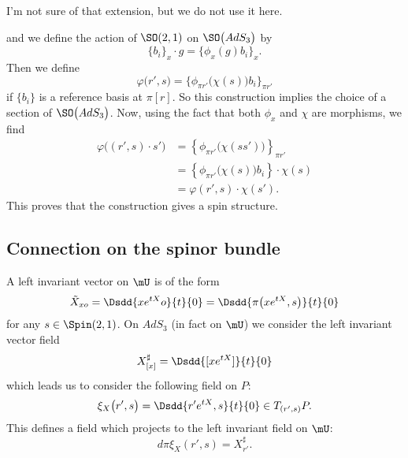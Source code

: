 \begin{probleme}
    I'm not sure of that extension, but we do not use it here.
\end{probleme}


and we define the action of $\SO(2,1)$ on $\SO\big( AdS_3 \big)$ by
\begin{equation}
\{ b_{i} \}_{x}\cdot g=\{ \phi_{x}(g)b_{i} \}_{x}.
\end{equation}
Then we define
\begin{equation}
  \varphi\big( r',s \big)=\{ \phi_{\pi r'}\big( \chi(s) \big)b_{i} \}_{\pi r'}
\end{equation}
 if $\{ b_{i} \}$ is a reference basis at $\pi[r]$. So this construction implies the choice of a section of $\SO\big( AdS_3 \big)$. Now, using the fact that both $\phi_{x}$ and $\chi$ are morphisms, we find
\begin{equation}
\begin{split}
\varphi\big( (r',s)\cdot s' \big)&=\left\{ \phi_{\pi r'}\big( \chi(ss') \big) \right\}_{\pi r'}\\
            &=\left\{ \phi_{\pi r'}\big( \chi(s) \big)b_{i} \right\}\cdot\chi(s)\\
            &=\varphi(r',s)\cdot\chi(s').
\end{split}
\end{equation}
This proves that the construction gives a spin structure.

\subsection{Connection on the spinor bundle}

A left invariant vector on $\mU$ is of the form
\[
  \tilde X_{xo}=\Dsdd{ x e^{tX}o }{t}{0}
        =\Dsdd{ \pi\big( x e^{tX},s \big) }{t}{0}
\]
for any $s\in\Spin(2,1)$. On $AdS_3$ (in fact on $\mU$) we consider the left invariant vector field
\begin{equation}
X^{\sharp}_{[x]}=\Dsdd{ [x e^{tX}] }{t}{0}
\end{equation}
which leads us to consider the following field on $P$:
\begin{equation}
\xi_{X}\big( r',s \big)=\Dsdd{ r' e^{tX},s }{t}{0}\in T_{( r',s )}P.
\end{equation}
This defines a field which projects to the left invariant field on $\mU$:
\begin{equation}   \label{eq_xiXprojXsharp}
d\pi\xi_{X}(r',s)=X^{\sharp}_{r'}.
\end{equation}


